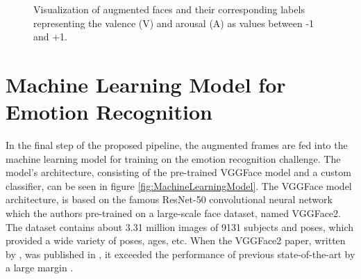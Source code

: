\begin{figure}[ht]
  \hfill
  \caption{Visualization of augmented faces and their corresponding labels representing the valence (V) and arousal (A) as values between -1 and +1.}
  \label{fig:MethodologyDataAugmentation}
\end{figure}


\section{Machine Learning Model for Emotion Recognition}
In the final step of the proposed pipeline, the augmented frames are fed into the machine learning model for training on the emotion recognition challenge. The model's architecture, consisting of the pre-trained VGGFace model \citep{Cao:2018:VGGFace2} and a custom classifier, can be seen in figure \ref{fig:MachineLearningModel}.
\newline\newline
The VGGFace model architecture, is based on the famous ResNet-50 convolutional neural network which the authors \citet{Cao:2018:VGGFace2} pre-trained on a large-scale face dataset, named VGGFace2. The dataset contains about 3.31 million images of 9131 subjects and poses, which provided a wide variety of poses, ages, etc. When the VGGFace2 paper, written by \citet{Cao:2018:VGGFace2}, was published in \citeyear{Cao:2018:VGGFace2}, it exceeded the performance of previous state-of-the-art by a large margin \citep{Cao:2018:VGGFace2}.


